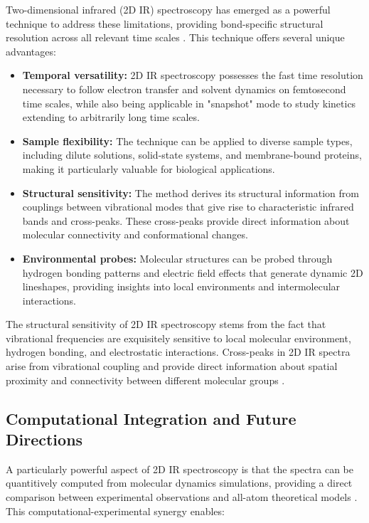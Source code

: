 \noindent Two-dimensional infrared (2D IR) spectroscopy has emerged as a powerful technique to address these limitations, providing bond-specific structural resolution across all relevant time scales \cite{hammzanni2011conceptsmethods2d}. This technique offers several unique advantages:

\begin{itemize}
	\item \textbf{Temporal versatility:} 2D IR spectroscopy possesses the fast time resolution necessary to follow electron transfer and solvent dynamics on femtosecond time scales, while also being applicable in "snapshot" mode to study kinetics extending to arbitrarily long time scales.

	\item \textbf{Sample flexibility:} The technique can be applied to diverse sample types, including dilute solutions, solid-state systems, and membrane-bound proteins, making it particularly valuable for biological applications.

	\item \textbf{Structural sensitivity:} The method derives its structural information from couplings between vibrational modes that give rise to characteristic infrared bands and cross-peaks. These cross-peaks provide direct information about molecular connectivity and conformational changes.

	\item \textbf{Environmental probes:} Molecular structures can be probed through hydrogen bonding patterns and electric field effects that generate dynamic 2D lineshapes, providing insights into local environments and intermolecular interactions.
\end{itemize}

\noindent The structural sensitivity of 2D IR spectroscopy stems from the fact that vibrational frequencies are exquisitely sensitive to local molecular environment, hydrogen bonding, and electrostatic interactions. Cross-peaks in 2D IR spectra arise from vibrational coupling and provide direct information about spatial proximity and connectivity between different molecular groups \cite{hammzanni2011conceptsmethods2d}.

\subsection{Computational Integration and Future Directions}
\label{subsec:computational_integration}

\noindent A particularly powerful aspect of 2D IR spectroscopy is that the spectra can be quantitively computed from molecular dynamics simulations, providing a direct comparison between experimental observations and all-atom theoretical models \cite{hammzanni2011conceptsmethods2d}. This computational-experimental synergy enables:

